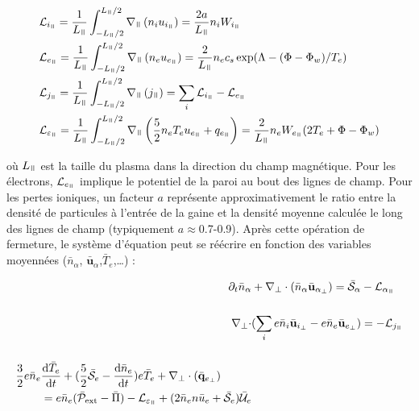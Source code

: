 \begin{refsection}
\begin{align}
\label{3-vitessesBord}
\begin{split}
\mathcal{L}&_{i_\para}=\frac{1}{L_\para}\int_{-L_\para/2}^{L_\para/2}\nabla_\para\left(n_iu_{i_\para}\right)=\frac{2a}{L_\para}n_iW_{i_\para}\\
\mathcal{L}&_{e_\para}=\frac{1}{L_\para}\int_{-L_\para/2}^{L_\para/2}\nabla_\para\left(n_eu_{e_\para}\right)=\frac{2}{L_\para}n_ec_s
\exp(\Lambda-(\Phi-\Phi_w)/T_e)\\
\mathcal{L}&_{j_\para}=\frac{1}{L_\para}\int_{-L_\para/2}^{L_\para/2}\nabla_\para\left(j_\para\right)=\sum_i\mathcal{L}_{i_\para}-\mathcal{L}_{e_\para}\\
\mathcal{L}&_{\varepsilon_\para}=\frac{1}{L_\para}
\int_{-L_\para/2}^{L_\para/2}\nabla_\para
\left(\frac{5}{2}n_eT_eu_{e_\para}+q_{e_\para}\right)
=\frac{2}{L_\para}n_eW_{e_\para}(2T_e+\Phi-\Phi_w)
\end{split}
\end{align}

où $L_\para$ est la taille du plasma dans la direction du champ magnétique. Pour
les électrons, $\mathcal{L}_{e_\para}$ implique le potentiel de la
paroi au bout des lignes de champ. Pour les pertes ioniques, un facteur $a$
représente approximativement le ratio entre la densité de particules à l'entrée
de la gaine et la densité moyenne calculée le long des lignes de champ
(typiquement $a\approx$0.7-0.9).
Après cette opération de fermeture, le système d'équation peut se réécrire en
fonction des variables moyennées ($\bar{n}_\alpha$, $\bar{\mathbf
u}_\alpha$,$\bar{T}_e$,\ldots) :

\begin{align}
\label{3-equations2D1}
\partial_t \bar{n}_\alpha& +
\nabla_\perp\cdot\left(\bar{n}_\alpha\bar{\mathbf{u}}_{\alpha_\perp}\right)=\bar{\mathcal{S}}_\alpha
- \mathcal{L}_{\alpha_\para}\\[0.5cm]
\nabla_\perp\cdot&(\sum_ie\bar{n}_i\bar{\mathbf{u}}_{i_\perp}
-e\bar{n}_e\bar{\mathbf{u}}_{e_\perp})= - \mathcal{L}_{j_\para}\\[0.5cm]
\begin{split}\frac{3}{2}e\bar{n}_e&\frac{\text{d}\bar{T}_e}{\text{d}t} +
(\frac{5}{2}\bar{\mathcal{S}}_e
-\frac{\text{d}\bar{n}_e}{\text{d}t})e\bar{T}_e+\nabla_\perp\cdot(\bar{\mathbf{q}}_{e_\perp})\\
&=e\bar{n}_e(\bar{\mathcal{P}}_\text{ext}-\bar{\Pi})-\mathcal{L}_{\varepsilon_\para}
+(2\bar{n}_en\bar{u}_e+\bar{\mathcal{S}}_e)\bar{\mathcal{U}}_e
\label{3-equations2D2}
\end{split}
\end{align}


\end{refsection}
